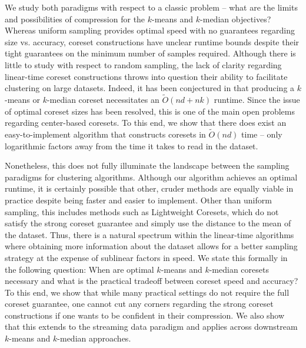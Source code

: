 We study both paradigms with respect to a classic problem -- what are the limits and possibilities of compression for the $k$-means and $k$-median objectives?
Whereas uniform sampling provides optimal speed with no guarantees regarding size vs. accuracy, coreset constructions have
unclear runtime bounds despite their tight guarantees on the minimum number of samples required. Although there is little to study with respect to random
sampling, the lack of clarity regarding linear-time coreset constructions throws into question their ability to facilitate clustering on large datasets.
Indeed, it has been conjectured in \cite{DSWY22} that producing a $k$-means or $k$-median coreset necessitates an $\tilde{O}(nd + nk)$ runtime.
Since the issue of optimal coreset sizes has been resolved, this is one of the main open problems regarding center-based coresets. To this end, we show that
there does exist an easy-to-implement algorithm that constructs coresets in $\tilde{O}(nd)$ time -- only logarithmic factors away from the time it takes to read
in the dataset.

Nonetheless, this does not fully illuminate the landscape between the sampling paradigms for clustering algorithms. Although our algorithm achieves an optimal
runtime, it is certainly possible that other, cruder methods are equally viable in practice despite being faster and easier to implement. Other than uniform
sampling, this includes methods such as Lightweight Coresets, which do not satisfy the strong coreset guarantee and simply use the distance to the mean
of the dataset. Thus, there is a natural spectrum within the linear-time algorithms where obtaining more information about the dataset allows for a better
sampling strategy at the expense of sublinear factors in speed. We state this formally in the following question: When are optimal $k$-means and $k$-median
coresets necessary and what is the practical tradeoff between coreset speed and accuracy? To this end, we show that while many practical settings do not require
the full coreset guarantee, one cannot cut any corners regarding the strong coreset constructions if one wants to be confident in their compression. We also
show that this extends to the streaming data paradigm and applies across downstream $k$-means and $k$-median approaches.
